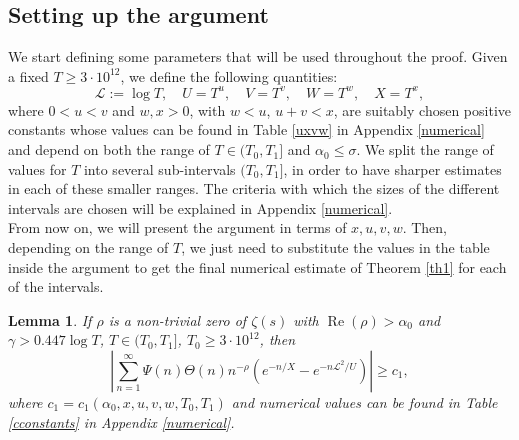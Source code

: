 \documentclass[reqno]{amsart}
\newtheorem{lemma}[theorem]{Lemma}
\numberwithin{equation}{section}
\theoremstyle{remark}
\begin{document}
\subsection{Setting up the argument}
We start defining some parameters that will be used throughout the proof. Given a fixed $T\ge 3\cdot 10^{12}$, we define the following quantities:
\begin{equation}\label{choiceparam}
    \mathscr{L}:=\log T,\quad U=T^u,\quad  V=T^v,\quad W=T^w, \quad X=T^x,
\end{equation} 
where $0<u<v$ and $w, x>0$, with $w<u$, $u+v<x$, are suitably chosen positive constants whose values can be found in Table \ref{uxvw} in Appendix \ref{numerical} and depend on both the range of $T\in (T_0,T_1]$ and $\alpha_0\le\sigma$. We split the range of values for $T$ into several sub-intervals $(T_0,T_1]$, in order to have sharper estimates in each of these smaller ranges. The criteria with which the sizes of the different intervals are chosen will be explained in Appendix \ref{numerical}.\\
From now on, we will present the argument in terms of $x,u,v,w$. Then, depending on the range of $T$, we just need to substitute the values in the table inside the argument to get the final numerical estimate of Theorem \ref{th1} for each of the intervals. 
\begin{lemma}\label{lowerbounddetector}
 If $\rho$ is a non-trivial zero of $\zeta(s)$ with $\operatorname{Re}(\rho)> \alpha_0$ and $\gamma>0.447\log T$, $T\in(T_0,T_1]$, $T_0\ge 3\cdot 10^{12}$, then
$$
\left|\sum_{n=1}^{\infty}\Psi(n)\Theta(n) n^{-\rho}\left(e^{-n / X}-e^{-n \mathscr{L}^2 / U}\right)\right| \ge c_1,
$$
where $c_1=c_1(\alpha_0,x,u,v,w,T_0,T_1)$ and numerical values can be found in Table \ref{cconstants} in Appendix \ref{numerical}.
\end{lemma}
\end{document}
